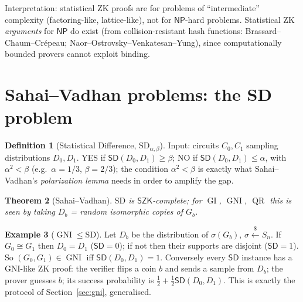 \documentclass[11pt,a4paper]{report}
\theoremstyle{plain}
\newtheorem{theorem}{Theorem}[chapter]
\theoremstyle{definition}
\newtheorem{definition}[theorem]{Definition}
\newtheorem{example}[theorem]{Example}
\theoremstyle{remark}
\newcommand{\getsr}{\xleftarrow{\$}}
\newcommand{\NP}{\mathsf{NP}}\newcommand{\BPP}{\mathsf{BPP}}\newcommand{\IP}{\mathsf{IP}}
\newcommand{\SZK}{\mathsf{SZK}}\newcommand{\CZK}{\mathsf{CZK}}\newcommand{\PZK}{\mathsf{PZK}}
\newcommand{\SD}{\mathsf{SD}}
\DeclareMathOperator{\GI}{GI}\DeclareMathOperator{\GNI}{GNI}
\DeclareMathOperator{\QR}{QR}\DeclareMathOperator{\QNR}{QNR}
\begin{document}
Interpretation: statistical ZK proofs are for problems of ``intermediate'' complexity (factoring-like, lattice-like), not for $\NP$-hard problems. Statistical ZK \emph{arguments} for $\NP$ do exist (from collision-resistant hash functions: Brassard--Chaum--Cr\'epeau; Naor--Ostrovsky--Venkatesan--Yung), since computationally bounded provers cannot exploit binding.

\section{Sahai--Vadhan problems: the SD problem}
\begin{definition}[Statistical Difference, $\mathrm{SD}_{\alpha,\beta}$]
Input: circuits $C_0,C_1$ sampling distributions $D_0,D_1$. YES if $\SD(D_0,D_1)\ge\beta$; NO if $\SD(D_0,D_1)\le\alpha$, with $\alpha^2<\beta$ (e.g.\ $\alpha=1/3$, $\beta=2/3$); the condition $\alpha^2<\beta$ is exactly what Sahai--Vadhan's \emph{polarization lemma} needs in order to amplify the gap.
\end{definition}
\begin{theorem}[Sahai--Vadhan]
$\mathrm{SD}$ is $\SZK$-complete; for $\GI$, $\GNI$, $\QR$ this is seen by taking $D_b$ = random isomorphic copies of $G_b$.
\end{theorem}
\begin{example}[$\GNI\le\mathrm{SD}$]
Let $D_b$ be the distribution of $\sigma(G_b)$, $\sigma\getsr S_n$. If $G_0\cong G_1$ then $D_0=D_1$ ($\SD=0$); if not then their supports are disjoint ($\SD=1$). So $(G_0,G_1)\in\GNI$ iff $\SD(D_0,D_1)=1$. Conversely every $\SD$ instance has a GNI-like ZK proof: the verifier flips a coin $b$ and sends a sample from $D_b$; the prover guesses $b$; its success probability is $\frac12+\frac12\SD(D_0,D_1)$. This is exactly the protocol of Section~\ref{sec:gni}, generalised.
\end{example}
\end{document}
